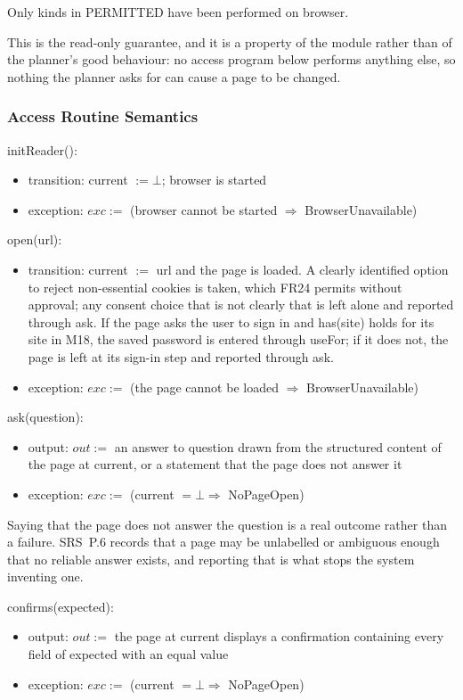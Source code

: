 \documentclass[12pt, titlepage]{article}
\newcommand{\nil}{\bot}
\begin{document}
Only kinds in PERMITTED have been performed on browser.

\noindent This is the read-only guarantee, and it is a property of the module
rather than of the planner's good behaviour: no access program below performs
anything else, so nothing the planner asks for can cause a page to be changed.

\subsubsection{Access Routine Semantics}

\noindent initReader():
\begin{itemize}
\item transition: current $:= \nil$; browser is started
\item exception: $exc :=$ (browser cannot be started $\Rightarrow$
BrowserUnavailable)
\end{itemize}

\noindent open(url):
\begin{itemize}
\item transition: current $:=$ url and the page is loaded. A clearly identified
option to reject non-essential cookies is taken, which FR24 permits without
approval; any consent choice that is not clearly that is left alone and reported
through ask. If the page asks the user to sign in and has(site) holds for its
site in M18, the saved password is entered through useFor; if it does not, the
page is left at its sign-in step and reported through ask.
\item exception: $exc :=$ (the page cannot be loaded $\Rightarrow$
BrowserUnavailable)
\end{itemize}

\noindent ask(question):
\begin{itemize}
\item output: $out :=$ an answer to question drawn from the structured content
of the page at current, or a statement that the page does not answer it
\item exception: $exc :=$ (current $= \nil \Rightarrow$ NoPageOpen)
\end{itemize}

\noindent Saying that the page does not answer the question is a real outcome
rather than a failure. SRS~P.6 records that a page may be unlabelled or
ambiguous enough that no reliable answer exists, and reporting that is what
stops the system inventing one.

\noindent confirms(expected):
\begin{itemize}
\item output: $out :=$ the page at current displays a confirmation containing
every field of expected with an equal value
\item exception: $exc :=$ (current $= \nil \Rightarrow$ NoPageOpen)
\end{itemize}
\end{document}

